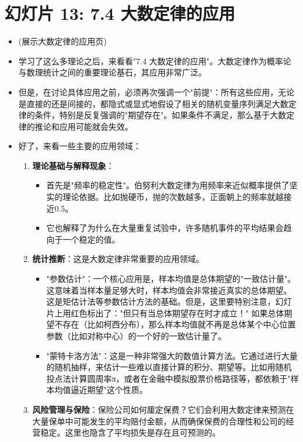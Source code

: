 \documentclass[UTF8]{article} %
\begin{document}
\section*{幻灯片 13: 7.4 大数定律的应用}
\begin{itemize}
    \itemsep1em
    \item (展示大数定律的应用页)
    \item 学习了这么多理论之后，来看看"7.4 大数定律的应用"。大数定律作为概率论与数理统计之间的重要理论基石，其应用非常广泛。
    \item 但是，在讨论具体应用之前，必须再次强调一个"前提"：所有这些应用，无论是直接的还是间接的，都隐式或显式地假设了相关的随机变量序列满足大数定律的条件，特别是反复强调的"期望存在"。如果条件不满足，那么基于大数定律的推论和应用可能就会失效。
    \item 好了，来看一些主要的应用领域：
    \begin{enumerate}[label=\arabic*., itemsep=0.5em]
        \item \textbf{理论基础与解释现象}：
        \begin{itemize}[label=\textbullet, itemsep=0.2em]
            \item 首先是"频率的稳定性"。伯努利大数定律为用频率来近似概率提供了坚实的理论依据。比如抛硬币，抛的次数越多，正面朝上的频率就越接近0.5。
            \item 它也解释了为什么在大量重复试验中，许多随机事件的平均结果会趋向于一个稳定的值。
        \end{itemize}
        \item \textbf{统计推断}：这是大数定律非常重要的应用领域。
        \begin{itemize}[label=\textbullet, itemsep=0.2em]
            \item "参数估计"：一个核心应用是，样本均值是总体期望的"一致估计量"。这意味着当样本量足够大时，样本均值会非常接近真实的总体期望。这是矩估计法等参数估计方法的基础。但是，这里要特别注意，幻灯片上用红色标出了："但只有当总体期望存在时才成立！" 如果总体期望不存在（比如柯西分布），那么样本均值就不再是总体某个中心位置参数（比如对称中心）的一个好的一致估计量了。
            \item "蒙特卡洛方法"：这是一种非常强大的数值计算方法。它通过进行大量的随机抽样，来估计一些难以直接计算的积分、期望等。比如用随机投点法计算圆周率π，或者在金融中模拟股票价格路径等，都依赖于"样本均值逼近期望"这个性质。
        \end{itemize}
        \item \textbf{风险管理与保险}：保险公司如何厘定保费？它们会利用大数定律来预测在大量保单中可能发生的平均赔付金额，从而确保保费的合理性和公司的经营稳定。这里也隐含了平均损失是存在且可预测的。

\end{enumerate}
\end{itemize}
\end{document}
